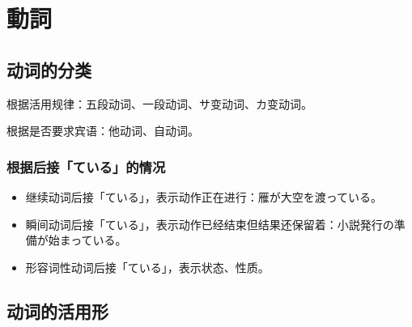 \section{動詞}%


\subsection{动词的分类}%

\noindent 根据活用规律：五段动词、一段动词、サ变动词、カ变动词。

\noindent 根据是否要求宾语：他动词、自动词。


\subsubsection{根据后接「ている」的情况}%

\begin{itemize}
  \item 继续动词后接「ている」，表示动作正在进行：雁が大空を渡っている。
  \item 瞬间动词后接「ている」，表示动作已经结束但结果还保留着：小説発行の準備が始まっている。
  \item 形容词性动词后接「ている」，表示状态、性质。
\end{itemize}



\subsection{动词的活用形}%

